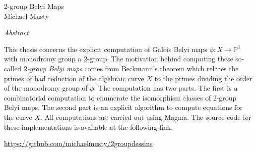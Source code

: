 \documentclass[12pt]{article}
\begin{document}
\thispagestyle{empty}
\begin{center}
 \Large $2$-group Belyi Maps\\
\large Michael Musty
\bigskip

\normalsize \textit{Abstract}
\end{center}
This thesis concerns the explicit computation
of Galois Belyi maps
$\phi\colon X\to\mathbb{P}^1$
with monodromy group
a $2$-group.
The motivation behind computing
these so-called
\emph{
$2$-group Belyi maps
}
comes from
Beckmann's theorem
which relates the primes of bad
reduction of the algebraic curve
$X$ to the primes
dividing the
order of the
monodromy group of $\phi$.
The computation has two parts.
The first is a combinatorial computation
to enumerate the isomorphism classes
of $2$-group Belyi maps.
The second part is an explicit algorithm
to compute equations for the curve
$X$.
All computations are carried out using
\textsf{Magma}.
The source code
for these implementations
is available at the following link.
\begin{center}
  \url{https://github.com/michaelmusty/2groupdessins}
\end{center}

% 
% 
\end{document}
